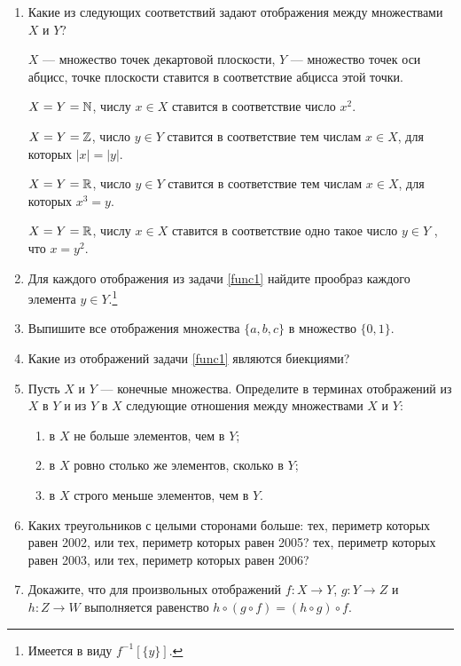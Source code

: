 \begin{enumerate}

\item \label{func1} Какие из следующих соответствий задают отображения между множествами $X$ и $Y$?

\noindent\ipunkt $X$ --- множество точек декартовой плоскости, $Y$ --- множество точек оси абцисс, точке плоскости ставится в соответствие абцисса этой точки.

\noindent\ipunkt $X = Y = \mathbb N$, числу $x \in X$ ставится в соответствие число $x^2$.

\noindent\ipunkt $X = Y = \mathbb Z$, число $y \in Y$ ставится в соответствие тем числам
$x \in X$, для которых $|x| = |y|$.

\noindent\ipunkt $X = Y = \mathbb R$, число $y \in Y$ ставится в соответствие тем числам
$x \in X$, для которых $x^3 = y$.

\noindent\ipunkt $X = Y = \mathbb R$, числу $x \in X$ ставится в соответствие одно такое
число $y \in Y$ , что $x = y^2$.

\item Для каждого отображения из задачи \ref{func1} найдите прообраз каждого элемента $y\in Y$.\footnote{Имеется в виду $f^{-1}[\{y\}]$.}

\item Выпишите все отображения множества $\{a,b,c\}$ в множество $\{0,1\}$.

\item Какие из отображений задачи \ref{func1} являются биекциями?

\item Пусть $X$ и $Y$ --- конечные множества. Определите в терминах отображений из $X$ в $Y$ и из $Y$ в $X$ следующие отношения между множествами $X$ и $Y$:
\begin{enumerate}
\item в $X$ не больше элементов, чем в $Y$;
\item в $X$ ровно столько же элементов, сколько в $Y$;
\item в $X$ строго меньше элементов, чем в $Y$.
\end{enumerate}


\item Каких треугольников с целыми сторонами больше:
\ipunkt тех, периметр которых равен 2002, или тех, периметр которых равен 2005?
\ipunkt тех, периметр которых равен 2003, или тех, периметр которых равен 2006?

\item Докажите, что для произвольных отображений $f:X \to Y$, $g:Y \to Z$ и $h:Z \to W$ выполняется равенство
$h \circ (g \circ f) = (h \circ g) \circ f$.


\end{enumerate}
